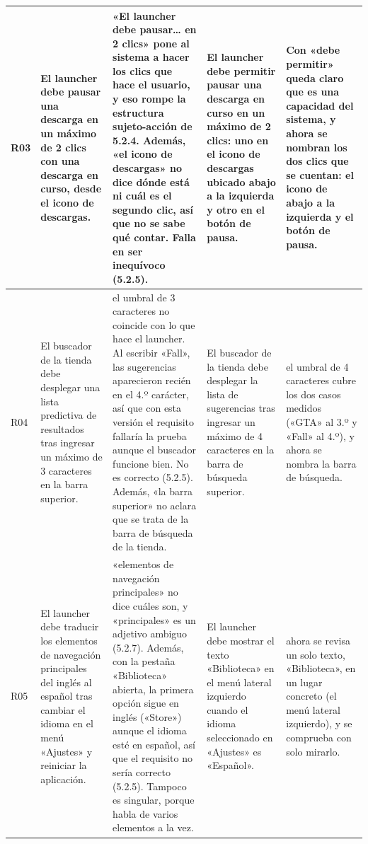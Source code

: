 \documentclass[10pt,a4paper]{article}
\begin{document}
\begin{landscape}
\begin{longtable}{|>{\raggedright\arraybackslash}p{1cm}|>{\raggedright\arraybackslash}p{5.6cm}|>{\raggedright\arraybackslash}p{5.6cm}|>{\raggedright\arraybackslash}p{7.4cm}|>{\raggedright\arraybackslash}p{5.0cm}|}
R03 & El launcher debe pausar una descarga en un máximo de 2 clics con una descarga en curso, desde el icono de descargas. & «El launcher debe pausar… en 2 clics» pone al sistema a hacer los clics que hace el usuario, y eso rompe la estructura sujeto-acción de 5.2.4. Además, «el icono de descargas» no dice dónde está ni cuál es el segundo clic, así que no se sabe qué contar. Falla en ser inequívoco (5.2.5). & El launcher debe permitir pausar una descarga en curso en un máximo de 2 clics: uno en el icono de descargas ubicado abajo a la izquierda y otro en el botón de pausa. & Con «debe permitir» queda claro que es una capacidad del sistema, y ahora se nombran los dos clics que se cuentan: el icono de abajo a la izquierda y el botón de pausa. \\ \hline
R04 & El buscador de la tienda debe desplegar una lista predictiva de resultados tras ingresar un máximo de 3 caracteres en la barra superior. & el umbral de 3 caracteres no coincide con lo que hace el launcher. Al escribir «Fall», las sugerencias aparecieron recién en el 4.º carácter, así que con esta versión el requisito fallaría la prueba aunque el buscador funcione bien. No es correcto (5.2.5). Además, «la barra superior» no aclara que se trata de la barra de búsqueda de la tienda. & El buscador de la tienda debe desplegar la lista de sugerencias tras ingresar un máximo de 4 caracteres en la barra de búsqueda superior. & el umbral de 4 caracteres cubre los dos casos medidos («GTA» al 3.º y «Fall» al 4.º), y ahora se nombra la barra de búsqueda. \\ \hline
R05 & El launcher debe traducir los elementos de navegación principales del inglés al español tras cambiar el idioma en el menú «Ajustes» y reiniciar la aplicación. & «elementos de navegación principales» no dice cuáles son, y «principales» es un adjetivo ambiguo (5.2.7). Además, con la pestaña «Biblioteca» abierta, la primera opción sigue en inglés («Store») aunque el idioma esté en español, así que el requisito no sería correcto (5.2.5). Tampoco es singular, porque habla de varios elementos a la vez. & El launcher debe mostrar el texto «Biblioteca» en el menú lateral izquierdo cuando el idioma seleccionado en «Ajustes» es «Español». & ahora se revisa un solo texto, «Biblioteca», en un lugar concreto (el menú lateral izquierdo), y se comprueba con solo mirarlo. \\ \hline

\end{longtable}
\end{landscape}
\end{document}
